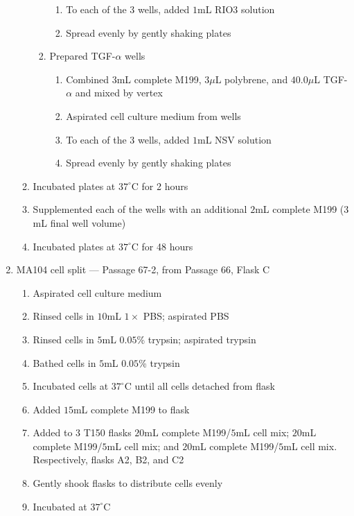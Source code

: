 \begin{enumerate}
\begin{enumerate}
\begin{enumerate}
\begin{enumerate}
							\item To each of the 3 wells, added $1$mL RIO3 solution
							\item Spread evenly by gently shaking plates
						\end{enumerate}
					\item Prepared TGF-$\alpha$ wells
						\begin{enumerate}
							\item Combined $3$mL complete M199, $3\mu$L polybrene, and $40.0\mu$L TGF-$\alpha$ and mixed by vertex
							\item Aspirated cell culture medium from wells
							\item To each of the 3 wells, added $1$mL NSV solution
							\item Spread evenly by gently shaking plates
						\end{enumerate}
				\end{enumerate}
			\item Incubated plates at $37^{\circ}$C for 2 hours
			\item Supplemented each of the wells with an additional $2$mL complete M199 ($3$mL final well volume)
			\item Incubated plates at $37^{\circ}$C for 48 hours
		\end{enumerate}
	\item MA104 cell split --- Passage 67-2, from Passage 66, Flask C
		\begin{enumerate}
			\item Aspirated cell culture medium
			\item Rinsed cells in $10$mL $1\times$ PBS; aspirated PBS
			\item Rinsed cells in $5$mL $0.05$\% trypsin; aspirated trypsin
			\item Bathed cells in $5$mL $0.05$\% trypsin
			\item Incubated cells at $37^{\circ}$C until all cells detached from flask
			\item Added $15$mL complete M199 to flask
			\item Added to $3$ T150 flasks $20$mL complete M199/$5$mL cell mix; $20$mL complete M199/$5$mL cell mix; and $20$mL complete M199/$5$mL cell mix. Respectively, flasks A2, B2, and C2
			\item Gently shook flasks to distribute cells evenly
			\item Incubated at $37^{\circ}$C
		\end{enumerate}
\end{enumerate}

